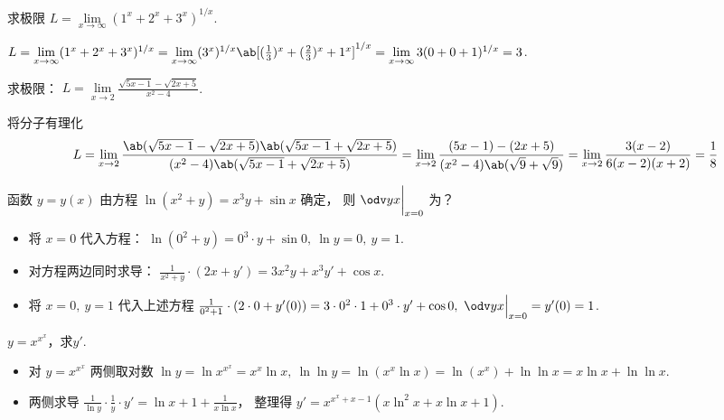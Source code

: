 \begin{problem}[本题5分]
  求极限 $L = \lim\limits_{{x \to \infty}} (1^x + 2^x + 3^x)^{1/x}$.
\end{problem}
\scratch[12ex]
\begin{solution}
  $ L = \lim\limits_{{x \to \infty}} (1^x + 2^x + 3^x)^{1/x}
      = \lim\limits_{{x \to \infty}}
        (3^x)^{1/x}\ab[(\frac13)^x + (\frac23)^x + 1^x]^{1/x}
      = \lim\limits_{{x \to \infty}} 3(0 + 0 + 1)^{1/x} = 3$.
\end{solution}

\begin{problem}[本题5分]
  求极限：
  $L = \lim\limits_{x \to 2} \frac{\sqrt{5x - 1} - \sqrt{2x + 5}}{x^2 - 4}$.
\end{problem}
\scratch[18ex]
\begin{solution}
  将分子有理化
  \[
    L = \lim_{x \to 2}
        \frac{\ab(\sqrt{5x - 1} - \sqrt{2x + 5})
              \ab(\sqrt{5x - 1} + \sqrt{2x + 5})}
          {(x^2 - 4)\ab(\sqrt{5x - 1} + \sqrt{2x + 5})}
      = \lim_{x \to 2}
        \frac{(5x - 1) - (2x + 5)}{(x^2 - 4) \ab(\sqrt9 + \sqrt9)}
      = \lim_{x \to 2} \frac{3(x - 2)}{6(x - 2)(x + 2)} = \frac18
  \]
\end{solution}

\begin{problem}[本题5分]
  函数 $y = y(x)$ 由方程 $\ln(x^2 + y) = x^3y + \sin x$ 确定，
  则 $\odv yx \bigg|_{x = 0}$ 为？
\end{problem}
\scratch[20ex]
\begin{solution}\leavevmode
  \begin{itemize}
    \item 将 $x = 0$ 代入方程：
    $\ln(0^2 + y) = 0^3 \cdot y + \sin 0,~ \ln y = 0,~ y = 1$.
    \item 对方程两边同时求导：
    $\frac{1}{x^2 + y} \cdot (2x + y') = 3x^2y + x^3y' + \cos x$.
    \item 将 $x = 0,~ y = 1$ 代入上述方程
    $ \frac{1}{0^2 + 1} \cdot (2 \cdot 0 + y'(0))
    = 3 \cdot 0^2 \cdot 1 + 0^3 \cdot y' + \cos 0,~
      \odv yx\Big|_{x = 0} = y'(0) =  1$.
  \end{itemize}
\end{solution}

\begin{problem}[本题5分]
  $y = x^{x^x}$，求$y'$.
\end{problem}
\scratch[16ex]
\begin{solution}\leavevmode
  \begin{itemize}
    \item 对 $y = x^{x^x}$ 两侧取对数
    $
      \ln y = \ln x^{x^x} = x^x\ln x,~
      \ln\ln y = \ln(x^x\ln x ) = \ln(x^x) + \ln\ln x = x\ln x + \ln\ln x
    $.
    \item 两侧求导
    $\frac{1}{\ln y} \cdot \frac1y \cdot y' = \ln x + 1 + \frac{1}{x\ln x}$，
    整理得 $y' = x^{x^x + x - 1} (x\ln ^2x + x\ln x + 1)$.
  \end{itemize}
\end{solution}

